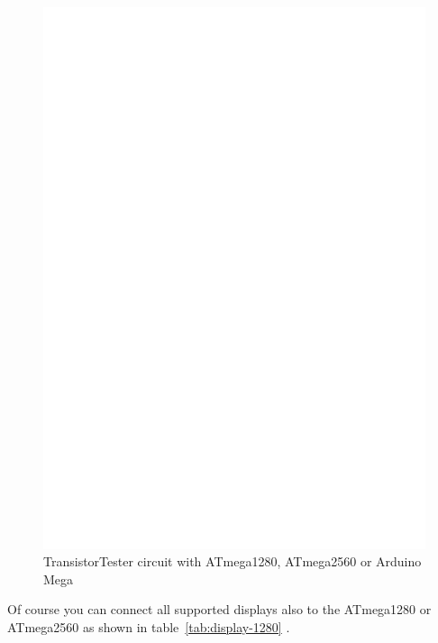 \begin{figure}[H]
\centering
\includegraphics[width=18cm]{../FIG/t1280tester.eps}
\caption{TransistorTester circuit with ATmega1280, ATmega2560 or Arduino Mega}
\label{fig:t1280tester}
\end{figure}

Of course you can connect all supported displays also to the ATmega1280 or ATmega2560
as shown in table~\ref{tab:display-1280} .

